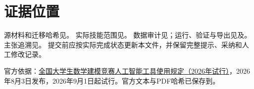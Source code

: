 \documentclass[UTF8,11pt,a4paper]{ctexart}
\begin{document}
\section{证据位置}
源材料和迁移哈希见。
实际技能范围见。
数据审计见；运行、验证与导出见及。
主张追溯见。
提交前应按实际完成状态更新本文件，并保留完整提示、采纳和人工修改记录。

官方依据：\href{https://www.mcm.edu.cn/html_cn/node/fef94648f2836ab6cc81586f4c38512b.html}{全国大学生数学建模竞赛人工智能工具使用规定（2026年试行）}，2026年8月3日发布，2026年9月1日起试行。官方文本与PDF哈希已保存到。
\end{document}
